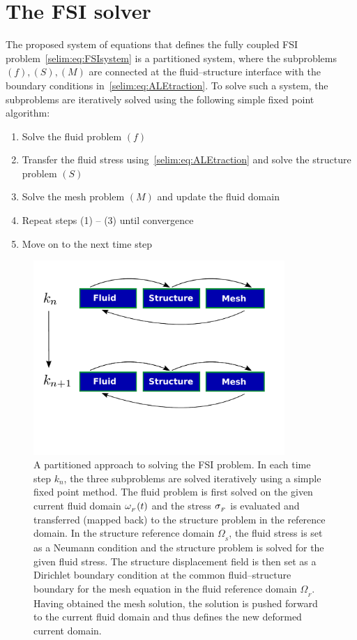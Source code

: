 \section{The FSI solver}
\label{selim:sec:primalsolver}
The proposed system of equations that defines the fully coupled FSI
problem~\eqref{selim:eq:FSIsystem} is a partitioned system, where the
subproblems $(f),(S),(M)$ are connected at the fluid--structure
interface with the boundary conditions
in~\eqref{selim:eq:ALEtraction}. To solve such a system, the
subproblems are iteratively solved using the following simple fixed
point algorithm:
\begin{enumerate}
\item
Solve the fluid problem $(f)$
\item
Transfer the fluid stress using~\eqref{selim:eq:ALEtraction} and
solve the structure problem $(S)$
\item
Solve the mesh problem $(M)$ and update the fluid domain
\item
Repeat steps (1) -- (3) until convergence
\item
Move on to the next time step
\end{enumerate}
\begin{figure}
  \includegraphics[width=0.85\textwidth]{chapters/selim/pdf/primal.pdf}
  \caption{A partitioned approach to solving the FSI problem. In each
    time step $k_n$, the three subproblems are solved iteratively
    using a simple fixed point method. The fluid problem is first
    solved on the given current fluid domain $\omega_{_{F}}(t)$ and the stress
    $\sigma_{_{F}}$ is evaluated and transferred (mapped back) to the
    structure problem in the reference domain. In the structure
    reference domain $\Omega_{_{S}}$, the fluid stress is set as a
    Neumann condition and the structure problem is solved for the
    given fluid stress. The structure displacement field is then set
    as a Dirichlet boundary condition at the common fluid--structure
    boundary for the mesh equation in the fluid reference domain
    $\Omega_{_{F}}$. Having obtained the mesh solution, the solution
    is pushed forward to the current fluid domain and thus defines the
    new deformed current domain.}
\end{figure}
